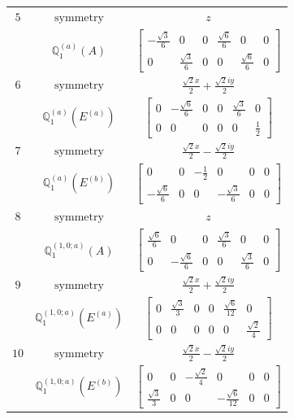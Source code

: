 \documentclass[fleqn,8pt,landscape]{jsarticle}
\begin{document}
\begin{longtable}{ccc}
$ 5 $ & $ \text{symmetry} $ & $ z $ \\
$  $ & $ \mathbb{Q}_{1}^{(a)}(A) $ & $ \begin{bmatrix} - \frac{\sqrt{3}}{6} & 0 & 0 & \frac{\sqrt{6}}{6} & 0 & 0 \\ 0 & \frac{\sqrt{3}}{6} & 0 & 0 & \frac{\sqrt{6}}{6} & 0 \end{bmatrix} $ \\ \hline
$ 6 $ & $ \text{symmetry} $ & $ \frac{\sqrt{2} x}{2} + \frac{\sqrt{2} i y}{2} $ \\
$  $ & $ \mathbb{Q}_{1}^{(a)}(E^{(a)}) $ & $ \begin{bmatrix} 0 & - \frac{\sqrt{6}}{6} & 0 & 0 & \frac{\sqrt{3}}{6} & 0 \\ 0 & 0 & 0 & 0 & 0 & \frac{1}{2} \end{bmatrix} $ \\ \hline
$ 7 $ & $ \text{symmetry} $ & $ \frac{\sqrt{2} x}{2} - \frac{\sqrt{2} i y}{2} $ \\
$  $ & $ \mathbb{Q}_{1}^{(a)}(E^{(b)}) $ & $ \begin{bmatrix} 0 & 0 & - \frac{1}{2} & 0 & 0 & 0 \\ - \frac{\sqrt{6}}{6} & 0 & 0 & - \frac{\sqrt{3}}{6} & 0 & 0 \end{bmatrix} $ \\ \hline
$ 8 $ & $ \text{symmetry} $ & $ z $ \\
$  $ & $ \mathbb{Q}_{1}^{(1,0;a)}(A) $ & $ \begin{bmatrix} \frac{\sqrt{6}}{6} & 0 & 0 & \frac{\sqrt{3}}{6} & 0 & 0 \\ 0 & - \frac{\sqrt{6}}{6} & 0 & 0 & \frac{\sqrt{3}}{6} & 0 \end{bmatrix} $ \\ \hline
$ 9 $ & $ \text{symmetry} $ & $ \frac{\sqrt{2} x}{2} + \frac{\sqrt{2} i y}{2} $ \\
$  $ & $ \mathbb{Q}_{1}^{(1,0;a)}(E^{(a)}) $ & $ \begin{bmatrix} 0 & \frac{\sqrt{3}}{3} & 0 & 0 & \frac{\sqrt{6}}{12} & 0 \\ 0 & 0 & 0 & 0 & 0 & \frac{\sqrt{2}}{4} \end{bmatrix} $ \\ \hline
$ 10 $ & $ \text{symmetry} $ & $ \frac{\sqrt{2} x}{2} - \frac{\sqrt{2} i y}{2} $ \\
$  $ & $ \mathbb{Q}_{1}^{(1,0;a)}(E^{(b)}) $ & $ \begin{bmatrix} 0 & 0 & - \frac{\sqrt{2}}{4} & 0 & 0 & 0 \\ \frac{\sqrt{3}}{3} & 0 & 0 & - \frac{\sqrt{6}}{12} & 0 & 0 \end{bmatrix} $ \\ \hline

\end{longtable}
\end{document}
